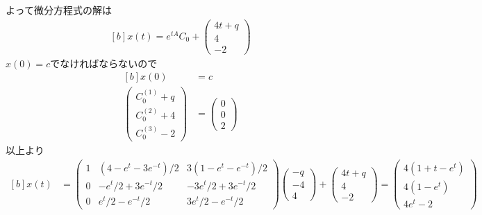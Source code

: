\documentclass[../ap_2014.tex]{subfiles}
\begin{document}
よって微分方程式の解は
\begin{equation}\begin{aligned}[b]
    x(t) = e^{tA}C_0
    +\begin{pmatrix}
        4t+q\\
        4\\
        -2
    \end{pmatrix}
\end{aligned}\end{equation}
\(x(0)=c\)でなければならないので
\begin{equation}\begin{aligned}[b]
    x(0)&= c\\
    \begin{pmatrix}
        C_{0}^{(1)}+q\\
        C_{0}^{(2)}+4\\
        C_{0}^{(3)}-2
    \end{pmatrix}
    &=\begin{pmatrix}
        0 \\
        0 \\
        2
    \end{pmatrix}
\end{aligned}\end{equation}
以上より
\begin{equation}\begin{aligned}[b]
    x(t) &= \begin{pmatrix}
        1 & (4-e^{t}-3e^{-t})/2 & 3(1-e^{t}-e^{-t})/2\\
        0 & -e^{t}/2+3e^{-t}/2 & -3e^{t}/2+3e^{-t}/2\\
        0 & e^{t}/2-e^{-t}/2 & 3e^{t}/2-e^{-t}/2
    \end{pmatrix}\begin{pmatrix}
        -q\\
        -4\\
        4
    \end{pmatrix}
    +\begin{pmatrix}
        4t+q\\
        4\\
        -2
    \end{pmatrix}
    =\begin{pmatrix}
        4(1+t-e^{t})\\
        4(1-e^{t})\\
        4e^{t}-2
    \end{pmatrix}
\end{aligned}\end{equation}
\end{document}
